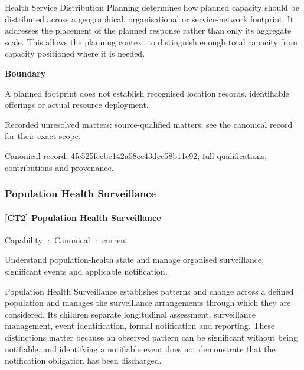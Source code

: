 Health Service Distribution Planning determines how planned capacity should be distributed across a geographical, organisational or service-network footprint. It addresses the placement of the planned response rather than only its aggregate scale. This allows the planning context to distinguish enough total capacity from capacity positioned where it is needed.



\textbf{Boundary}



A planned footprint does not establish recognised location records, identifiable offerings or actual resource deployment.


{\small Recorded unresolved matters: source-qualified matters; see the canonical record for their exact scope.}\par
{\footnotesize \href{../../../../continuum/strategy/capability/4fc525fccbe142a58ee43dcc58b11c92.md}{Canonical record: 4fc525fccbe142a58ee43dcc58b11c92}; full qualifications, contributions and provenance.}\par
\subsubsection{Population Health Surveillance}

\paragraph{[CT2] Population Health Surveillance}

\label{element:83e568fa8af14d7791a7253765ea390f}
{\small Capability · Canonical · current}\par

Understand population-health state and manage organised surveillance, significant events and applicable notification.



Population Health Surveillance establishes patterns and change across a defined population and manages the surveillance arrangements through which they are considered. Its children separate longitudinal assessment, surveillance management, event identification, formal notification and reporting. These distinctions matter because an observed pattern can be significant without being notifiable, and identifying a notifiable event does not demonstrate that the notification obligation has been discharged.



